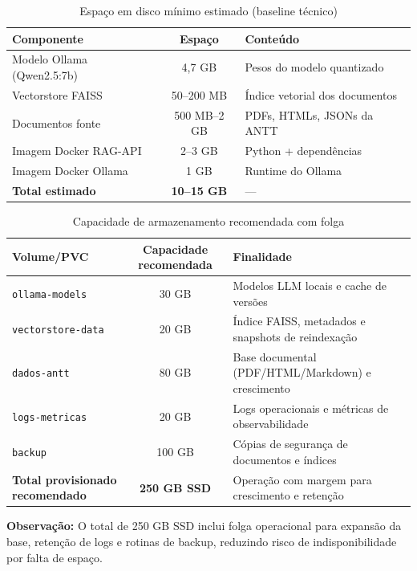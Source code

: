 \documentclass[12pt, a4paper]{article}
\begin{document}
\begin{table}[H]
\centering
\small
\caption{Espaço em disco mínimo estimado (baseline técnico)}
\label{tab:disco}
\begin{tabular}{l c l}
\toprule
\textbf{Componente} & \textbf{Espaço} & \textbf{Conteúdo} \\
\midrule
Modelo Ollama (Qwen2.5:7b) & 4,7 GB & Pesos do modelo quantizado \\
Vectorstore FAISS & 50--200 MB & Índice vetorial dos documentos \\
Documentos fonte & 500 MB--2 GB & PDFs, HTMLs, JSONs da ANTT \\
Imagem Docker RAG-API & 2--3 GB & Python + dependências \\
Imagem Docker Ollama & 1 GB & Runtime do Ollama \\
\midrule
\textbf{Total estimado} & \textbf{10--15 GB} & --- \\
\bottomrule
\end{tabular}
\end{table}

\begin{table}[H]
\centering
\small
\caption{Capacidade de armazenamento recomendada com folga}
\label{tab:disco_folga}
\begin{tabularx}{\textwidth}{l c X}
\toprule
\textbf{Volume/PVC} & \textbf{Capacidade recomendada} & \textbf{Finalidade} \\
\midrule
\texttt{ollama-models} & 30 GB & Modelos LLM locais e cache de versões \\
\texttt{vectorstore-data} & 20 GB & Índice FAISS, metadados e snapshots de reindexação \\
\texttt{dados-antt} & 80 GB & Base documental (PDF/HTML/Markdown) e crescimento \\
\texttt{logs-metricas} & 20 GB & Logs operacionais e métricas de observabilidade \\
\texttt{backup} & 100 GB & Cópias de segurança de documentos e índices \\
\midrule
\textbf{Total provisionado recomendado} & \textbf{250 GB SSD} & Operação com margem para crescimento e retenção \\
\bottomrule
\end{tabularx}
\end{table}

\noindent\textbf{Observação:} O total de 250 GB SSD inclui folga operacional para expansão da base, retenção de logs e rotinas de backup, reduzindo risco de indisponibilidade por falta de espaço.
\end{document}
